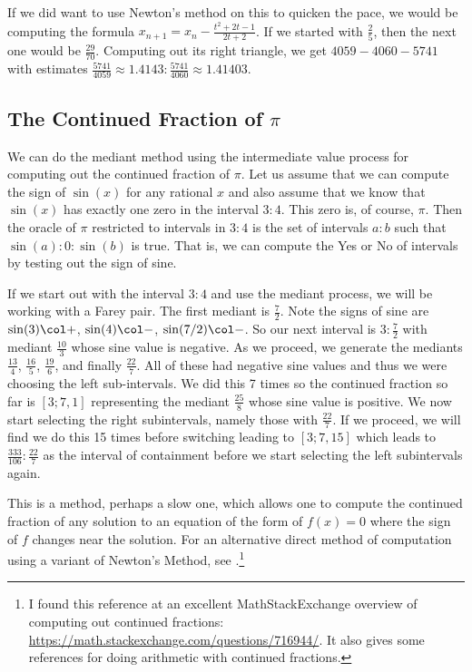 \documentclass[12pt]{article}
\theoremstyle{remark}
\begin{document}
If we did want to use Newton's method on this to quicken the pace, we would be computing the formula $x_{n+1} = x_n - \frac{ t^2  + 2t -1}{2t + 2}$. If we started with $\frac{2}{5}$, then the next one would be $\frac{29}{70}$. Computing out its right triangle, we get $4059-4060-5741$ with estimates $\frac{5741}{4059}\approx 1.4143: \frac{5741}{4060} \approx 1.41403$. 

\subsection{The Continued Fraction of $\pi$}

We can do the mediant method using the intermediate value process for computing out the continued fraction of $\pi$. Let us assume that we can compute the sign of $\sin(x)$ for any rational $x$ and also assume that we know that $\sin(x)$ has exactly one zero in the interval $3:4$. This zero is, of course, $\pi$. Then the oracle of $\pi$ restricted to intervals in $3:4$ is the set of intervals $a:b$ such that $\sin(a):0:\sin(b)$ is true. That is, we can compute the Yes or No of intervals by testing out the sign of sine. 

If we start out with the interval  $3:4$ and use the mediant process, we will be working with a Farey pair. The first mediant is $\frac{7}{2}$. Note the signs of sine are  $\sin(3) \col +$, $\sin(4) \col -$, $\sin(7/2) \col -$. So our next interval is $3:\frac{7}{2}$ with mediant $\frac{10}{3}$ whose sine value is negative. As we proceed, we generate the mediants $\frac{13}{4}$, $\frac{16}{5}$, $\frac{19}{6}$, and finally $\frac{22}{7}$. All of these had negative sine values and thus we were choosing the left sub-intervals. We did this 7 times so the continued fraction so far is $[3;7,1]$ representing the mediant $\frac{25}{8}$ whose sine value is positive. We now start selecting the right subintervals, namely those with $\frac{22}{7}$. If we proceed, we will find we do this 15 times before switching leading to $[3; 7, 15]$ which leads to $\frac{333}{106}:\frac{22}{7}$ as the interval of containment before we start selecting the left subintervals again.

This is a method, perhaps a slow one, which allows one to compute the continued fraction of any solution to an equation of the form of $f(x) =0$ where the sign of $f$ changes near the solution. For an alternative direct method of computation using a variant of Newton's Method, see \cite{shiu95}.\footnote{I found this reference at an excellent MathStackExchange overview of computing out continued fractions: \url{https://math.stackexchange.com/questions/716944/}.  It also gives some references for doing arithmetic with continued fractions.} 
\end{document}

